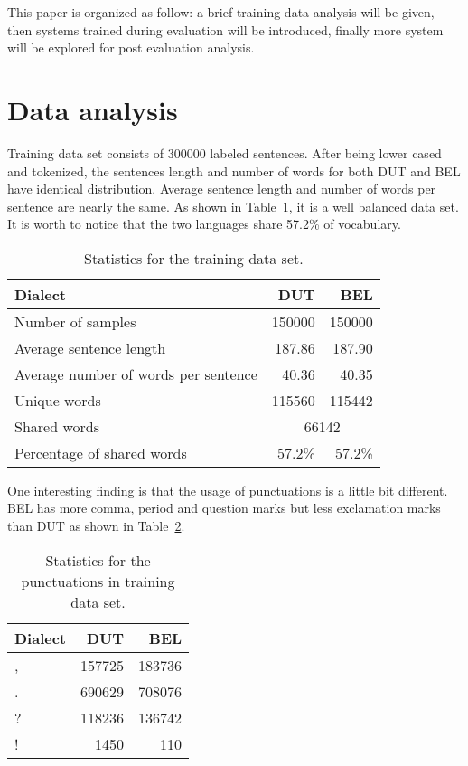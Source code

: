 \documentclass[11pt]{article}
\begin{document}
This paper is organized as follow: a brief training data analysis will be given, then systems trained during evaluation will be introduced, finally more system will be explored for post evaluation analysis. 

\section{Data analysis}

Training data set consists of 300000 labeled sentences. After being lower cased and tokenized, the sentences length and number of words for both DUT and BEL have identical distribution. Average sentence length and number of words per sentence are nearly the same. As shown in Table~\ref{vocab}, it is a well balanced data set. It is worth to notice that the two languages share 57.2\% of vocabulary.

 
\begin{table}[h]
	\centering
	
	
	\begin{tabular}{|l|r|r|}
		\hline
		
		Dialect & DUT & BEL \\ \hline
		Number of samples & 150000 & 150000  \\ \hline
		Average sentence length & 187.86 & 187.90 \\ \hline
		Average number of words per sentence & 40.36 & 40.35 \\ \hline
		Unique words & 115560 & 115442 \\ \hline 
		Shared words & \multicolumn{2}{|c|}{66142}  \\ \hline
		Percentage of shared words & 57.2\% & 57.2\%  \\ \hline
	\end{tabular}
	\caption{Statistics for the training data set.}
	\label{vocab}
\end{table}

One interesting finding is that the usage of punctuations is a little bit different. BEL has more comma, period and question marks but less exclamation marks than DUT as shown in Table~\ref{punctuations}.

\begin{table}[h]
	\centering
	
	
	\begin{tabular}{|l|r|r|}
		\hline
		Dialect & DUT & BEL \\ \hline
		, & 157725 & 183736  \\ \hline
		. & 690629 & 708076 \\ \hline
		? & 118236 & 136742 \\ \hline
		! & 1450 & 110 \\ \hline 
	
	\end{tabular}
	\caption{Statistics for the punctuations in training data set.}
	\label{punctuations}
\end{table}
\end{document}
